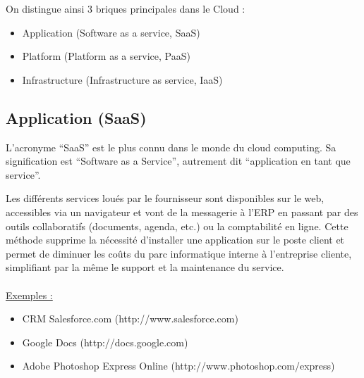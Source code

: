 \documentclass[a4paper,12pt]{report}
\begin{document}
\begin{onehalfspace}
	On distingue ainsi 3 briques principales dans le Cloud :
	\begin{itemize}
		\item Application (Software as a service, SaaS)
		\item Platform (Platform as a service, PaaS)
		\item Infrastructure (Infrastructure as service, IaaS)
	\end{itemize}
	
	\subsection{Application (SaaS)}
	L’acronyme “SaaS” est le plus connu dans le monde du cloud computing. Sa signification est “Software as a Service”, autrement dit “application en tant que service”.
	
	Les différents services loués par le fournisseur sont disponibles sur le web, accessibles via un navigateur et vont de la messagerie à l’ERP en passant par des outils collaboratifs (documents, agenda, etc.) ou la comptabilité en ligne. Cette méthode supprime la nécessité d’installer une application sur le poste client et permet de diminuer les coûts du parc informatique interne à l’entreprise cliente, simplifiant par la même le support et la maintenance du service.
	
	\paragraph*{}
	\underline{Exemples :}
	\begin{itemize}
		\item CRM Salesforce.com (http://www.salesforce.com)
		\item Google Docs (http://docs.google.com)
		\item Adobe Photoshop Express Online (http://www.photoshop.com/express)
	\end{itemize}


\end{onehalfspace}
\end{document}

